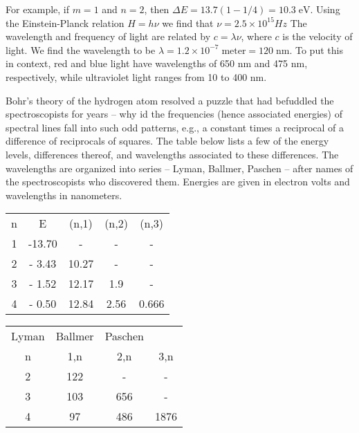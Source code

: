 For example, if $m = 1$ and $n = 2$, then $\Delta E = 13.7(1-1/4) = 10.3\;\text{eV}$.  Using the Einstein-Planck relation $H = h\nu$ we find that $\nu = 2.5\times 10^{15} Hz$  The wavelength and frequency of light are related by  $c = \lambda \nu$, where $c$ is the velocity of light.  We find the wavelength to be $\lambda = 1.2\times 10^{-7}\;\text{meter}  =120\;\text{nm}$. To put this in context, red and blue light have wavelengths of 650 nm and 475 nm, respectively, while ultraviolet light ranges from 10 to 400 nm.

Bohr's theory of the hydrogen atom resolved a puzzle that had befuddled the spectroscopists for years -- why id the frequencies (hence associated energies) of spectral lines fall into such odd patterns, e.g., a constant times a reciprocal of a difference of reciprocals of squares.  The table below lists a few of the energy levels, differences thereof, and wavelengths associated to these differences.  The wavelengths are organized into series -- Lyman, Ballmer, Paschen -- after names of the spectroscopists who discovered them.  Energies are given in electron volts and wavelengths in nanometers.

\begin{indent}
\begin{tabular}{ |c|c|c|c|c| }
n &   E  & (n,1) & (n,2) & (n,3)  \\
1 & -13.70 &   -   &    -   &   -     \\
2 & - 3.43 & 10.27 &   -    &   -   \\
3 & - 1.52 & 12.17 & 1.9   &    -   \\
4 & - 0.50 & 12.84 & 2.56  & 0.666  \\
\end{tabular}
\end{indent}


\begin{indent}
\begin{tabular}{ |c|c|c|c| }
Lyman & Ballmer & Paschen   \\
n & 1,n &   2,n    & 3,n    \\
2 & 122 &    -      &   -     \\
3 & 103 &   656    &   -     \\
4 &  97 &   486    & 1876   \\
\end{tabular}
\end{indent}


